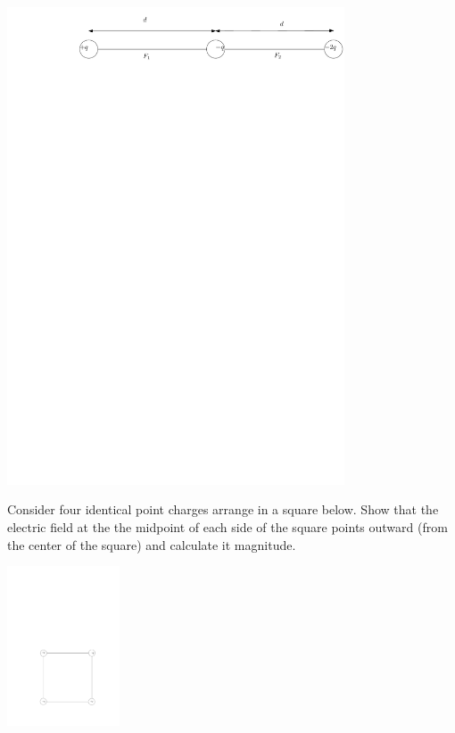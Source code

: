 \documentclass[12pt]{article}
\begin{document}
\includegraphics[width=0.75\textwidth]{3-charges-2.pdf}

\newpage
\noindent Consider four identical point charges arrange in a square below.  Show that the electric field at the the midpoint of each side of the square points outward (from the center of the square) and calculate it magnitude.

\includegraphics[width=0.25\textwidth]{square.pdf}
\end{document}
